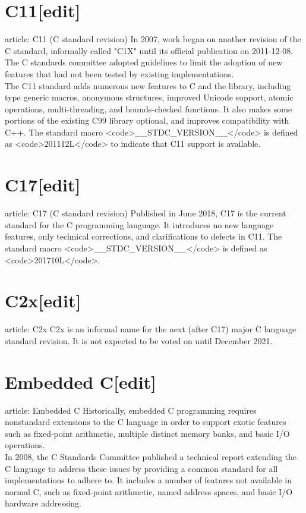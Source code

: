 \documentclass{article}\usepackage{titlesec}
\begin{document}
\section{C11[edit]}
\itemMain article: C11 (C standard revision)
In 2007, work began on another revision of the C standard, informally called "C1X" until its official publication on 2011-12-08. The C standards committee adopted guidelines to limit the adoption of new features that had not been tested by existing implementations.
\\
The C11 standard adds numerous new features to C and the library, including type generic macros, anonymous structures, improved Unicode support, atomic operations, multi-threading, and bounds-checked functions.  It also makes some portions of the existing C99 library optional, and improves compatibility with C++. The standard macro <code>\_\_STDC\_VERSION\_\_</code> is defined as <code>201112L</code> to indicate that C11 support is available.
\\

\section{C17[edit]}
\itemMain article: C17 (C standard revision)
Published in June 2018, C17 is the current standard for the C programming language. It introduces no new language features, only technical corrections, and clarifications to defects in C11. The standard macro <code>\_\_STDC\_VERSION\_\_</code> is defined as <code>201710L</code>.
\\

\section{C2x[edit]}
\itemMain article: C2x
C2x is an informal name for the next (after C17) major C language standard revision. It is not expected to be voted on until December 2021.
\\

\section{Embedded C[edit]}
\itemMain article: Embedded C
Historically, embedded C programming requires nonstandard extensions to the C language in order to support exotic features such as fixed-point arithmetic, multiple distinct memory banks, and basic I/O operations.
\\
In 2008, the C Standards Committee published a technical report extending the C language to address these issues by providing a common standard for all implementations to adhere to. It includes a number of features not available in normal C, such as fixed-point arithmetic, named address spaces, and basic I/O hardware addressing.
\\
\end{document}
